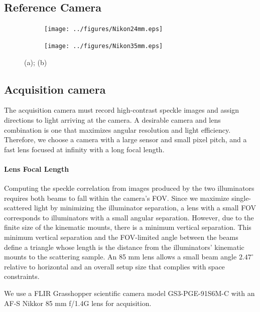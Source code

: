 \subsection{Reference Camera}
\begin{figure}
    \centering
    \begin{subfigure}{0.49\textwidth}
        \centering
        \texttt{[image: ../figures/Nikon24mm.eps]}
        \caption{}    %
        \label{fig:beamspots_nikon24mm}
    \end{subfigure}
    \begin{subfigure}{0.49\textwidth}
        \centering
        \texttt{[image: ../figures/Nikon35mm.eps]}
        \caption{}
        \label{fig:beamspots_nikon35mm}
    \end{subfigure}
    \caption{(a); (b)}
    \label{fig:refcam_beamspots}
\end{figure}


\subsection{Acquisition camera}
The acquisition camera must record high-contrast speckle images and assign directions to light arriving at the camera. A desirable camera and lens combination is one that maximizes angular resolution and light efficiency. Therefore, we choose a camera with a large sensor and small pixel pitch, and a fast lens focused at infinity with a long focal length.

\paragraph{Lens Focal Length} Computing the speckle correlation from images produced by the two illuminators requires both beams to fall within the camera's FOV. Since we maximize single-scattered light by minimizing the illuminator separation, a lens with a small FOV corresponds to illuminators with a small angular separation. However, due to the finite size of the kinematic mounts, there is a minimum vertical separation. This minimum vertical separation and the FOV-limited angle between the beams define a triangle whose length is the distance from the illuminators' kinematic mounts to the scattering sample. An 85 mm lens allows a small beam angle $2.47^\circ$ relative to horizontal and an overall setup size that complies with space constraints.

We use a FLIR Grasshopper scientific camera model GS3-PGE-91S6M-C with an AF-S Nikkor 85 \si{\mm} f/1.4G lens for acquisition.

